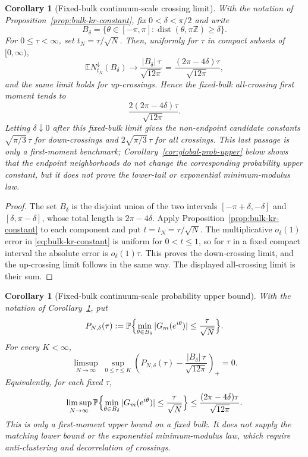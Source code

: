 \documentclass[11pt]{amsart}
\numberwithin{equation}{section}
\newtheorem{corollary}[theorem]{Corollary}
\theoremstyle{definition}
\theoremstyle{remark}
\newcommand{\Prob}{\mathbb P}
\newcommand{\Exp}{\mathbb E}
\newcommand{\dist}{\operatorname{dist}}
\begin{document}
\begin{corollary}[Fixed-bulk continuum-scale crossing limit]
\label{cor:bulk-continuum-intensity}
With the notation of Proposition~\ref{prop:bulk-kr-constant}, fix
\(0<\delta<\pi/2\) and write
\[
  B_\delta=\{\theta\in[-\pi,\pi]:\dist(\theta,\pi\mathbb Z)\ge\delta\}.
\]
For \(0\le\tau<\infty\), set \(t_N=\tau/\sqrt N\).  Then, uniformly for
\(\tau\) in compact subsets of \([0,\infty)\),
\[
  \Exp N_{t_N}^\downarrow(B_\delta)
  \longrightarrow
  \frac{|B_\delta|\,\tau}{\sqrt{12\pi}}
  =
  \frac{(2\pi-4\delta)\tau}{\sqrt{12\pi}},
\]
and the same limit holds for up-crossings.  Hence the fixed-bulk all-crossing
first moment tends to
\[
  \frac{2(2\pi-4\delta)\tau}{\sqrt{12\pi}}.
\]
Letting \(\delta\downarrow0\) after this fixed-bulk limit gives the non-endpoint
candidate constants \(\sqrt{\pi/3}\,\tau\) for down-crossings and
\(2\sqrt{\pi/3}\,\tau\) for all crossings.  This last passage is only a
first-moment benchmark; Corollary~\ref{cor:global-prob-upper} below shows that
the endpoint neighborhoods do not change the corresponding probability upper
constant, but it does not prove the lower-tail or exponential minimum-modulus
law.
\end{corollary}

\begin{proof}
The set \(B_\delta\) is the disjoint union of the two intervals
\([-\pi+\delta,-\delta]\) and \([\delta,\pi-\delta]\), whose total length is
\(2\pi-4\delta\).  Apply Proposition~\ref{prop:bulk-kr-constant} to each
component and put \(t=t_N=\tau/\sqrt N\).  The multiplicative
\(o_\delta(1)\) error in \eqref{eq:bulk-kr-constant} is uniform for
\(0<t\le1\), so for \(\tau\) in a fixed compact interval the absolute error is
\(o_\delta(1)\tau\).  This proves the down-crossing limit, and the up-crossing
limit follows in the same way.  The displayed all-crossing limit is their sum.
\end{proof}

\begin{corollary}[Fixed-bulk continuum-scale probability upper bound]
\label{cor:bulk-prob-upper}
With the notation of Corollary~\ref{cor:bulk-continuum-intensity}, put
\[
  P_{N,\delta}(\tau):=
  \Prob\Bigl\{
    \min_{\theta\in B_\delta}|G_m(e^{i\theta})|
    \le \frac{\tau}{\sqrt N}
  \Bigr\}.
\]
For every \(K<\infty\),
\[
  \limsup_{N\to\infty}\;
  \sup_{0\le\tau\le K}
  \left(
    P_{N,\delta}(\tau)
    -\frac{|B_\delta|\,\tau}{\sqrt{12\pi}}
  \right)_+
  =0 .
\]
Equivalently, for each fixed \(\tau\),
\[
  \limsup_{N\to\infty}
  \Prob\Bigl\{
    \min_{\theta\in B_\delta}|G_m(e^{i\theta})|
    \le \frac{\tau}{\sqrt N}
  \Bigr\}
  \le
  \frac{(2\pi-4\delta)\tau}{\sqrt{12\pi}}.
\]
This is only a first-moment upper bound on a fixed bulk.  It does not supply
the matching lower bound or the exponential minimum-modulus law, which require
anti-clustering and decorrelation of crossings.
\end{corollary}
\end{document}
